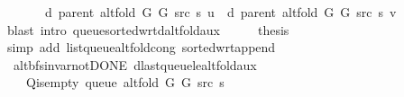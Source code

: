 \begin{isabellebody}
\ \ \ \ \ \ \ d\ {\isacharparenleft}{\kern0pt}parent\ {\isacharparenleft}{\kern0pt}alt{\isacharunderscore}{\kern0pt}fold\ G{}\ G{}\ src\ s{\isacharparenright}{\kern0pt}{\isacharparenright}{\kern0pt}\ u\ {\isasymle}\ d\ {\isacharparenleft}{\kern0pt}parent\ {\isacharparenleft}{\kern0pt}alt{\isacharunderscore}{\kern0pt}fold\ G{}\ G{}\ src\ s{\isacharparenright}{\kern0pt}{\isacharparenright}{\kern0pt}\ v{\isachardoublequoteclose}\isanewline
\ \ \ \ \isamarkupfalse%
\ {\isacharparenleft}{\kern0pt}blast\ intro{\isacharcolon}{\kern0pt}\ queue{\isacharunderscore}{\kern0pt}sorted{\isacharunderscore}{\kern0pt}wrt{\isacharunderscore}{\kern0pt}d{\isacharunderscore}{\kern0pt}alt{\isacharunderscore}{\kern0pt}fold{\isacharunderscore}{\kern0pt}aux{\isacharparenright}{\kern0pt}\isanewline
\ \ \isamarkupfalse%
\ \isamarkupfalse%
\ {\isacharquery}{\kern0pt}thesis\ \isanewline
\ \ \ \ \isamarkupfalse%
\ {\isacharparenleft}{\kern0pt}simp\ add{\isacharcolon}{\kern0pt}\ list{\isacharunderscore}{\kern0pt}queue{\isacharunderscore}{\kern0pt}alt{\isacharunderscore}{\kern0pt}fold{\isacharunderscore}{\kern0pt}cong\ sorted{\isacharunderscore}{\kern0pt}wrt{\isacharunderscore}{\kern0pt}append{\isacharparenright}{\kern0pt}\isanewline
{}\isamarkupfalse%
%
\endisatagproof
{\isafoldproof}%
%
\isadelimproof
\isanewline
%
\endisadelimproof
%
\isadeliminvisible
\isanewline
%
\endisadeliminvisible
%
\isataginvisible
{}\isamarkupfalse%
\ {\isacharparenleft}{\kern0pt}\ alt{\isacharunderscore}{\kern0pt}bfs{\isacharunderscore}{\kern0pt}invar{\isacharunderscore}{\kern0pt}not{\isacharunderscore}{\kern0pt}DONE{\isacharparenright}{\kern0pt}\ d{\isacharunderscore}{\kern0pt}last{\isacharunderscore}{\kern0pt}queue{\isacharunderscore}{\kern0pt}le{\isacharunderscore}{\kern0pt}alt{\isacharunderscore}{\kern0pt}fold{\isacharunderscore}{\kern0pt}aux{\isacharcolon}{\kern0pt}\isanewline
\ \ \ {\isachardoublequoteopen}{\isasymnot}\ Q{\isacharunderscore}{\kern0pt}is{\isacharunderscore}{\kern0pt}empty\ {\isacharparenleft}{\kern0pt}queue\ {\isacharparenleft}{\kern0pt}alt{\isacharunderscore}{\kern0pt}fold\ G{}\ G{}\ src\ s{\isacharparenright}{\kern0pt}{\isacharparenright}{\kern0pt}{\isachardoublequoteclose}\isanewline

\end{isabellebody}

